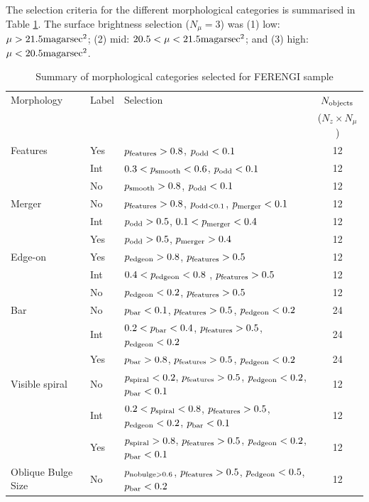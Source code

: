 \documentclass[usenatbib]{mn2e}
\begin{document}
 The selection criteria for the different morphological categories is summarised in Table \ref{morphologies}. The surface brightness selection ($N_\mu = 3$) was (1) low: $\mu > 21.5 {\rm mag arsec}^2$;  (2) mid: $20.5 < \mu < 21.5 {\rm mag arsec}^2$; and (3) high: $\mu < 20.5 {\rm mag arsec}^2$. 
 
\begin{table}
\caption{Summary of morphological categories selected for FERENGI sample \label{morphologies}}
\begin{tabular}{lllc}
\hline\hline
Morphology & Label &  Selection & $N_{\rm objects}$ \\
 & & & ($N_z \times N_\mu$) \\
\hline
Features & Yes & $p_{\rm features} > 0.8$, $p_{\rm odd} < 0.1$ & 12 \\ 
 & Int & $0.3 < p_{\rm smooth} < 0.6$, $p_{\rm odd} < 0.1$ & 12 \\ 
 & No &  $p_{\rm smooth} > 0.8$, $p_{\rm odd} < 0.1$ & 12 \\ 
Merger & No & $p_{\rm features} > 0.8$, $p_{\rm odd < 0.1}$, $p_{\rm merger} < 0.1$ & 12\\
& Int & $p_{\rm odd} > 0.5$, $0.1< p_{\rm merger} < 0.4$ & 12 \\ 
& Yes & $p_{\rm odd} > 0.5$, $p_{\rm merger} > 0.4$ & 12\\
Edge-on & Yes &  $p_{\rm edgeon} > 0.8$, $p_{\rm features} > 0.5$ & 12 \\
& Int & $0.4 < p_{\rm edgeon} < 0.8$ , $p_{\rm features} > 0.5$ & 12 \\
& No & $p_{\rm edgeon} < 0.2$, $p_{\rm features} > 0.5$ & 12 \\
Bar & No & $p_{\rm bar} < 0.1$, $p_{\rm features} > 0.5$, $p_{\rm edgeon} < 0.2$ & 24 \\
& Int & $0.2 < p_{\rm bar} < 0.4$, $p_{\rm features} > 0.5$, $p_{\rm edgeon} < 0.2$ & 24 \\
& Yes&  $p_{\rm bar} > 0.8$, $p_{\rm features} > 0.5$, $p_{\rm edgeon} < 0.2$ & 24 \\
Visible spiral & No & $p_{\rm spiral} < 0.2$, $p_{\rm features} > 0.5$, $p_{\rm edgeon} < 0.2$, $p_{\rm bar} < 0.1$ & 12 \\
& Int &  $0.2 < p_{\rm spiral} < 0.8$, $p_{\rm features} > 0.5$, $p_{\rm edgeon} < 0.2$, $p_{\rm bar} < 0.1$ & 12 \\
& Yes &  $p_{\rm spiral} > 0.8$, $p_{\rm features} > 0.5$, $p_{\rm edgeon} < 0.2$, $p_{\rm bar} < 0.1$ & 12 \\
Oblique Bulge Size & No & $p_{\rm nobulge>0.6}$, $p_{\rm features} > 0.5$, $p_{\rm edgeon} < 0.5$, $p_{\rm bar} < 0.2$ & 12 \\

\end{tabular}
\end{table}
\end{document}
